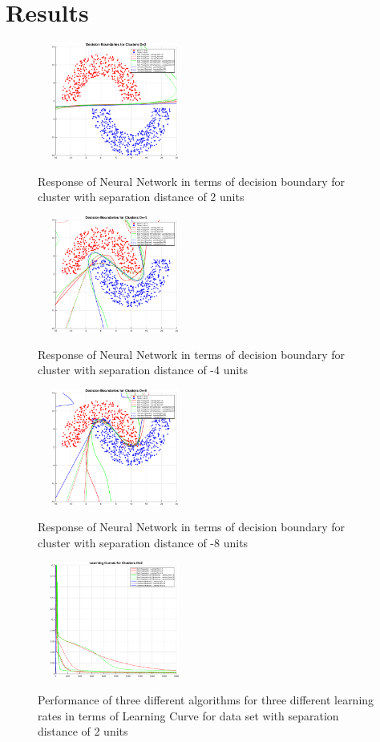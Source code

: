 \documentclass[conference]{IEEEtran}
\begin{document}
\section{Results}
\begin{figure}[h!]
\centering
{\includegraphics[width=2in,height=1.5in,clip,keepaspectratio]{Exp1_DB2.eps} }\\
\caption{Response of Neural Network in terms of decision boundary for cluster with separation distance of 2 units }
\end{figure}
\begin{figure}[h!]
\centering
{\includegraphics[width=2in,height=1.5in,clip,keepaspectratio]{Exp1_DBn4.eps} }\\
\caption{Response of Neural Network in terms of decision boundary for cluster with separation distance of -4 units}
\end{figure}
\begin{figure}[h!]
\centering
{\includegraphics[width=2in,height=1.5in,clip,keepaspectratio]{Exp1_DBn8.eps} }\\
\caption{Response of Neural Network in terms of decision boundary for cluster with separation distance of -8 units}
\end{figure}
\begin{figure}[h!]
\centering
{\includegraphics[width=2in,height=1.5in,clip,keepaspectratio]{Exp1_LC2.eps} }
\caption{Performance of three different algorithms for three different learning rates in terms of Learning Curve for data set with separation distance of 2 units }
\end{figure}
\end{document}
